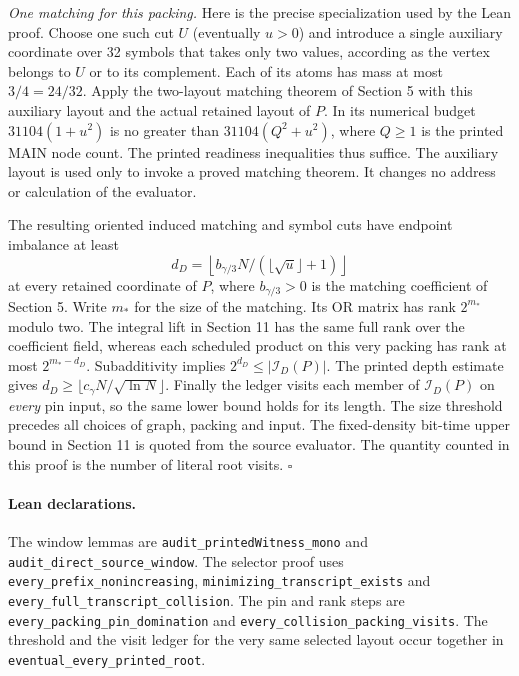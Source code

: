 \documentclass[
  11pt,
]{article}
\begin{document}
\emph{One matching for this packing.} Here is the precise specialization
used by the Lean proof. Choose one such cut \(U\) (eventually \(u>0\))
and introduce a single auxiliary coordinate over 32 symbols that takes
only two values, according as the vertex belongs to \(U\) or to its
complement. Each of its atoms has mass at most \(3/4=24/32\). Apply
the two-layout matching theorem of Section 5 with this auxiliary
layout and the actual retained layout of \(P\). In its numerical budget
\(31104(1+u^2)\) is no greater than \(31104(Q^2+u^2)\), where \(Q\ge1\)
is the printed MAIN node count. The printed readiness inequalities
thus suffice. The auxiliary layout is used only to invoke a proved
matching theorem. It changes no address or calculation of the evaluator.

The resulting oriented induced matching and symbol cuts have endpoint
imbalance at least
\[
 d_D=\left\lfloor b_{\gamma/3} N/(\lfloor\sqrt u\rfloor+1)\right\rfloor
\]
at every retained coordinate of \(P\), where \(b_{\gamma/3}>0\) is the
matching coefficient of Section 5. Write \(m_*\) for the size of the
matching. Its OR matrix has rank \(2^{m_*}\) modulo two. The integral
lift in Section 11 has the same full rank over the coefficient field,
whereas each scheduled product on this very packing has rank at most
\(2^{m_*-d_D}\). Subadditivity implies \(2^{d_D}\le|\mathcal I_D(P)|\).
The printed depth estimate gives
\(d_D\ge\lfloor c_\gamma N/\sqrt{\ln N}\rfloor\).
Finally the ledger visits each member of \(\mathcal I_D(P)\) on
\emph{every} pin input, so the same lower bound holds for its length.
The size threshold precedes all choices of graph, packing and input.
The fixed-density bit-time upper bound in Section 11 is quoted from
the source evaluator. The quantity counted in this proof is the
number of literal root visits. \(\square\)

\paragraph{Lean declarations.}
The window lemmas are \nolinkurl{audit_printedWitness_mono} and
\nolinkurl{audit_direct_source_window}. The selector proof uses
\nolinkurl{every_prefix_nonincreasing},
\nolinkurl{minimizing_transcript_exists} and
\nolinkurl{every_full_transcript_collision}.
The pin and rank steps are \nolinkurl{every_packing_pin_domination}
and \nolinkurl{every_collision_packing_visits}.
The threshold and the visit ledger for the very same selected layout
occur together in \nolinkurl{eventual_every_printed_root}.
\end{document}
